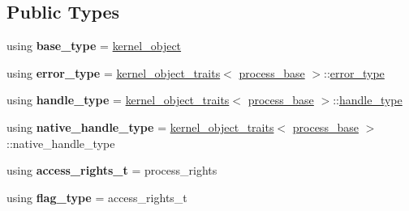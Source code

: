 \subsection*{Public Types}
\begin{DoxyCompactItemize}
\item 
\mbox{\label{classdistant_1_1kernel__objects_1_1process__base_a2bbdf1b2c69e2f076aba267294dac8a5}} 
using {\bfseries base\+\_\+type} = \mbox{\hyperlink{classdistant_1_1kernel__objects_1_1kernel__object}{kernel\+\_\+object}}
\item 
\mbox{\label{classdistant_1_1kernel__objects_1_1process__base_af6e123be2cae7818d2695fd98a904f1e}} 
using {\bfseries error\+\_\+type} = \mbox{\hyperlink{structdistant_1_1kernel__object__traits}{kernel\+\_\+object\+\_\+traits}}$<$ \mbox{\hyperlink{classdistant_1_1kernel__objects_1_1process__base}{process\+\_\+base}} $>$\+::\mbox{\hyperlink{classdistant_1_1error_1_1windows__error__code}{error\+\_\+type}}
\item 
\mbox{\label{classdistant_1_1kernel__objects_1_1process__base_a8dc331497fcc1d116c595bf412b0b6c8}} 
using {\bfseries handle\+\_\+type} = \mbox{\hyperlink{structdistant_1_1kernel__object__traits}{kernel\+\_\+object\+\_\+traits}}$<$ \mbox{\hyperlink{classdistant_1_1kernel__objects_1_1process__base}{process\+\_\+base}} $>$\+::\mbox{\hyperlink{classdistant_1_1handle}{handle\+\_\+type}}
\item 
\mbox{\label{classdistant_1_1kernel__objects_1_1process__base_a167dca0d4baabe8ca206b2e6e1b03282}} 
using {\bfseries native\+\_\+handle\+\_\+type} = \mbox{\hyperlink{structdistant_1_1kernel__object__traits}{kernel\+\_\+object\+\_\+traits}}$<$ \mbox{\hyperlink{classdistant_1_1kernel__objects_1_1process__base}{process\+\_\+base}} $>$\+::native\+\_\+handle\+\_\+type
\item 
\mbox{\label{classdistant_1_1kernel__objects_1_1process__base_a551a3e72af7a0c58c6b4eb4f6c4f7d0e}} 
using {\bfseries access\+\_\+rights\+\_\+t} = process\+\_\+rights
\item 
\mbox{\label{classdistant_1_1kernel__objects_1_1process__base_a66d761572fa3db89575a79d396277667}} 
using {\bfseries flag\+\_\+type} = access\+\_\+rights\+\_\+t
\end{DoxyCompactItemize}
